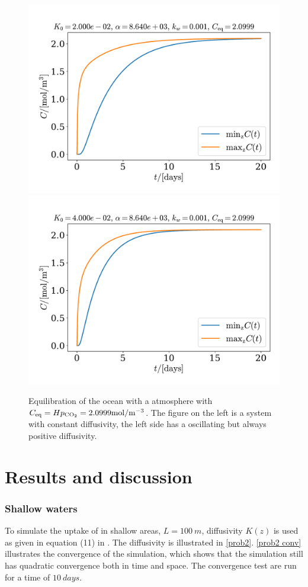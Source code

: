 \documentclass{article}
\begin{document}
    \begin{figure}[H]
        \centering
        \includegraphics[width=.49\textwidth]{../plots/test5_minmax}
        \includegraphics[width=.49\textwidth]{../plots/test5_varK_minmax}
        \caption{Equilibration of the ocean with a atmosphere with $C_\mathrm{eq} = H p_{\ce{CO2}}=2.0999\si{mol/m^{-3}}$.
        The figure on the left is a system with constant diffusivity, the left side has a oscillating but always positive diffusivity.}
        \label{minmax}
    \end{figure}

    \section*{Results and discussion}
    \subsubsection*{Shallow waters}

    To simulate the uptake of  in shallow areas, $L=\SI{100}{m}$, diffusivity $K(z)$ is used as given in equation (11) in \cite{exercise}.
    The diffusivity is illustrated in \autoref{prob2}.
    \autoref{prob2 conv} illustrates the convergence of the simulation, which shows that the simulation still has quadratic convergence both in time and space.
    The convergence test are run for a time of $\SI{10}{days}$.
\end{document}

